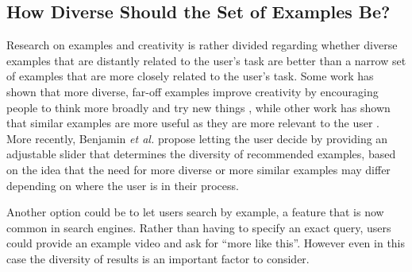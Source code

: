 \subsection{How Diverse Should the Set of Examples Be?}
Research on examples and creativity is rather divided regarding whether diverse examples that are distantly related to the user's task are better than a narrow set of examples that are more closely related to the user's task. Some work has shown that more diverse, far-off examples improve creativity by encouraging people to think more broadly and try new things \cite{Chan2011, Siangliulue2015a}, while other work has shown that similar examples are more useful as they are more relevant to the user \cite{Chan2015}. More recently, Benjamin \textit{et al.} \cite{Benjamin2014} propose letting the user decide by providing an adjustable slider that determines the diversity of recommended examples, based on the idea that the need for more diverse or more similar examples may differ depending on where the user is in their process.

Another option could be to let users search by example, a feature that is now common in search engines. Rather than having to specify an exact query, users could provide an example video and ask for ``more like this''. However even in this case the diversity of results is an important factor to consider.


